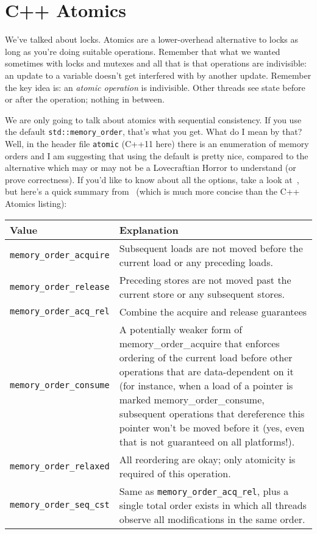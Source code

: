 




\section*{C++ Atomics}
We've talked about locks. Atomics are a lower-overhead alternative to
locks as long as you're doing suitable operations. Remember that what we wanted sometimes with locks and mutexes and all that is that operations are indivisible: an update to a variable doesn't get interfered with by another update. Remember the key idea is: an \textit{atomic operation} is indivisible. Other threads see state before or after the operation; nothing in between.


We are only going to talk about atomics with sequential consistency. If you use the default {\tt std::memory\_order}, that's what you get. What do I mean by that? Well, in the header file \texttt{atomic} (C++11 here) there is an enumeration of memory orders and I am suggesting that using the default is pretty nice, compared to the alternative which may or may not be a Lovecraftian Horror to understand (or prove correctness). If you'd like to know about all the options, take a look at~\cite{cppatomics}, but here's a quick summary from~\cite{bmref1} (which is much more concise than the C++ Atomics listing):

\begin{center}
	\begin{tabular}{l|p{12cm}}
	\textbf{Value} & \textbf{Explanation} \\ \hline
		\texttt{memory\_order\_acquire} &  Subsequent loads are not moved before the current load or any preceding loads.\\ \hline
		\texttt{memory\_order\_release} &  Preceding stores are not moved past the current store or any subsequent stores. \\ \hline
		\texttt{memory\_order\_acq\_rel} & Combine the acquire and release guarantees\\ \hline
		\texttt{memory\_order\_consume} & A potentially weaker form of memory\_order\_acquire that enforces ordering of the current load before other operations that are data-dependent on it (for instance, when a load of a pointer is marked memory\_order\_consume, subsequent operations that dereference this pointer won't be moved before it (yes, even that is not guaranteed on all platforms!).\\ \hline
	
	\texttt{memory\_order\_relaxed} & All reordering are okay; only atomicity is required of this operation. \\ \hline
\texttt{memory\_order\_seq\_cst} & Same as \texttt{memory\_order\_acq\_rel}, plus a single total order exists in which all threads observe all modifications in the same order.\\ 
	\end{tabular}

\end{center}



